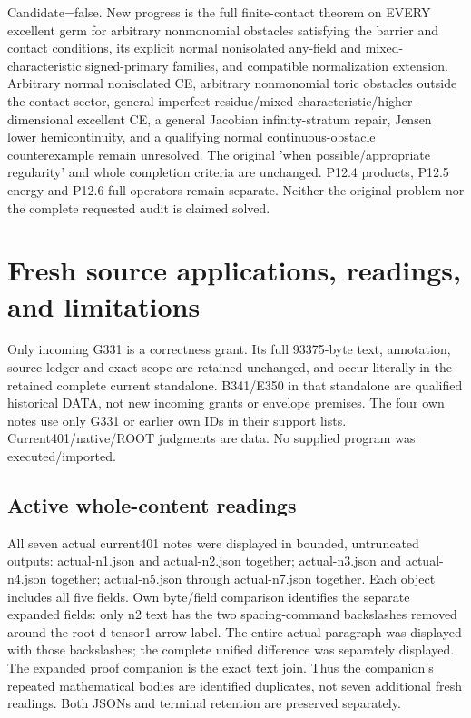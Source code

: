 \documentclass[11pt]{article}
\begin{document}
Candidate=false. New progress is the full finite-contact theorem on EVERY excellent germ for arbitrary nonmonomial obstacles satisfying the barrier and contact conditions, its explicit normal nonisolated any-field and mixed-characteristic signed-primary families, and compatible normalization extension. Arbitrary normal nonisolated CE, arbitrary nonmonomial toric obstacles outside the contact sector, general imperfect-residue/mixed-characteristic/higher-dimensional excellent CE, a general Jacobian infinity-stratum repair, Jensen lower hemicontinuity, and a qualifying normal continuous-obstacle counterexample remain unresolved. The original 'when possible/appropriate regularity' and whole completion criteria are unchanged. P12.4 products, P12.5 energy and P12.6 full operators remain separate. Neither the original problem nor the complete requested audit is claimed solved.
\section{Fresh source applications, readings, and limitations}

Only incoming G331 is a correctness grant. Its full 93375-byte text, annotation, source ledger and exact scope are retained unchanged, and occur literally in the retained complete current standalone. B341/E350 in that standalone are qualified historical DATA, not new incoming grants or envelope premises. The four own notes use only G331 or earlier own IDs in their support lists. Current401/native/ROOT judgments are data. No supplied program was executed/imported.

\subsection{Active whole-content readings}

All seven actual current401 notes were displayed in bounded, untruncated outputs: actual-n1.json and actual-n2.json together; actual-n3.json and actual-n4.json together; actual-n5.json through actual-n7.json together. Each object includes all five fields. Own byte/field comparison identifies the separate expanded fields: only n2 text has the two spacing-command backslashes removed around the root d tensor1 arrow label. The entire actual paragraph was displayed with those backslashes; the complete unified difference was separately displayed. The expanded proof companion is the exact text join. Thus the companion's repeated mathematical bodies are identified duplicates, not seven additional fresh readings. Both JSONs and terminal retention are preserved separately.
\end{document}
